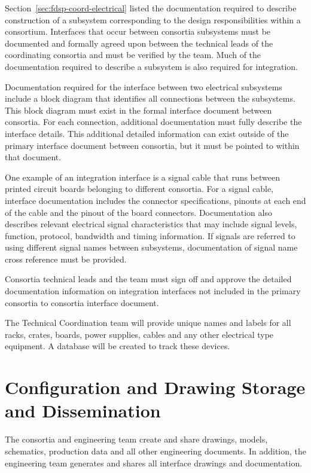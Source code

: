 Section~\ref{sec:fdsp-coord-electrical} listed the documentation
required to describe construction of a subsystem corresponding to the
design responsibilities within a consortium.  Interfaces that occur
between consortia subsystems must be documented and formally agreed
upon between the technical leads of the coordinating consortia and
must be verified by the  team.  Much of the
documentation required to describe a subsystem is also required for
integration.


Documentation required for the interface between two electrical
subsystems include a block diagram that identifies all connections
between the subsystems.  This block diagram must exist in the formal
interface document between consortia.  For each connection, additional
documentation must fully describe the interface
details. This additional detailed information can exist outside of the
primary interface document between consortia, but it must be pointed
to within that document.


One example of an integration interface is a signal cable that runs
between printed circuit boards belonging to different consortia.  For
a signal cable, interface documentation includes the connector
specifications, pinouts at each end of the cable and the pinout of the
board connectors.  Documentation also describes
relevant electrical signal characteristics that may include signal
levels, function, protocol, bandwidth and timing information.  If
signals are referred to using different signal names between
subsystems, documentation of signal name cross reference must be
provided.


Consortia technical leads and the  team must sign off
and approve the detailed documentation information on integration
interfaces not included in the primary consortia to consortia
interface document.

The Technical Coordination team will provide unique names and labels for all racks, crates, boards, power supplies, cables and any other electrical type equipment.  A database will be created to track these devices.

\section{Configuration and Drawing Storage and Dissemination}
\label{sec:fdsp-coord-integ-modelplan}

The consortia and  engineering team create and share
drawings, models, schematics, production data and all other
engineering documents. In addition, the  engineering team
generates and shares all interface drawings and documentation.



